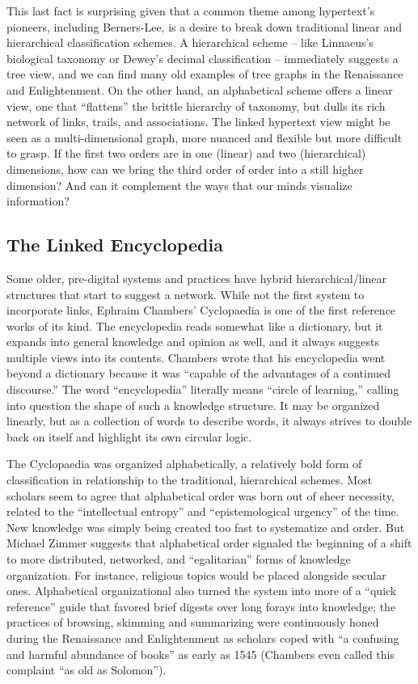 This last fact is surprising given that a common theme among hypertext’s pioneers, including Berners-Lee, is a desire to break down traditional linear and hierarchical classification schemes. A hierarchical scheme – like Linnaeus’s biological taxonomy or Dewey’s decimal classification – immediately suggests a tree view, and we can find many old examples of tree graphs in the Renaissance and Enlightenment.  On the other hand, an alphabetical scheme offers a linear view, one that “flattens” the brittle hierarchy of taxonomy, but dulls its rich network of links, trails, and associations. The linked hypertext view might be seen as a multi-dimensional graph, more nuanced and flexible but more difficult to grasp. If the first two orders are in one (linear) and two (hierarchical) dimensions, how can we bring the third order of order into a still higher dimension? And can it complement the ways that our minds visualize information?

\subsection{The Linked Encyclopedia}

Some older, pre-digital systems and practices have hybrid hierarchical/linear structures that start to suggest a network. While not the first system to incorporate links, Ephraim Chambers’ Cyclopaedia is one of the first reference works of its kind. The encyclopedia reads somewhat like a dictionary, but it expands into general knowledge and opinion as well, and it always suggests multiple views into its contents. Chambers wrote that his encyclopedia went beyond a dictionary because it was “capable of the advantages of a continued discourse.”  The word “encyclopedia” literally means “circle of learning,” calling into question the shape of such a knowledge structure. It may be organized linearly, but as a collection of words to describe words, it always strives to double back on itself and highlight its own circular logic.

The Cyclopaedia was organized alphabetically, a relatively bold form of classification in relationship to the traditional, hierarchical schemes. Most scholars seem to agree that alphabetical order was born out of sheer necessity, related to the “intellectual entropy” and “epistemological urgency” of the time.  New knowledge was simply being created too fast to systematize and order. But Michael Zimmer suggests that alphabetical order signaled the beginning of a shift to more distributed, networked, and “egalitarian” forms of knowledge organization.  For instance, religious topics would be placed alongside secular ones. Alphabetical organizational also turned the system into more of a “quick reference” guide that favored brief digests over long forays into knowledge; the practices of browsing, skimming and summarizing were continuously honed during the Renaissance and Enlightenment as scholars coped with “a confusing and harmful abundance of books” as early as 1545 (Chambers even called this complaint “as old as Solomon”). 

